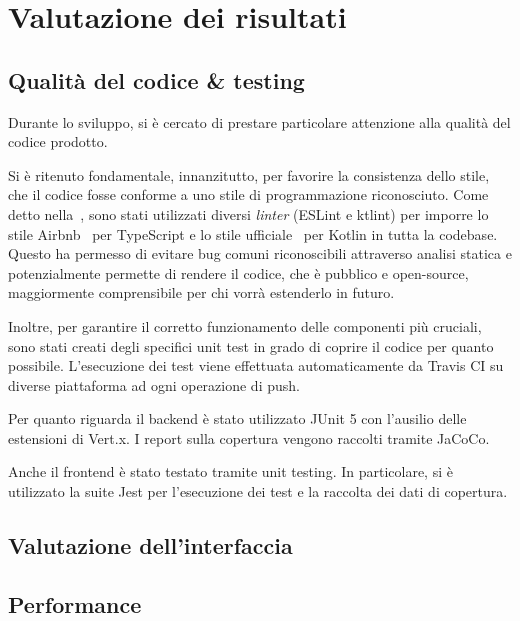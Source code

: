 \chapter{Valutazione dei risultati}\label{ch:evaluation}

  \section{Qualità del codice \& testing}
    Durante lo sviluppo, si è cercato di prestare particolare attenzione alla qualità del codice prodotto.

    Si è ritenuto fondamentale, innanzitutto, per favorire la consistenza dello stile, che il codice fosse conforme a uno stile di programmazione riconosciuto.
    Come detto nella~, sono stati utilizzati diversi \emph{linter} (ESLint e ktlint)
    per imporre lo stile Airbnb~\cite{airbnb-javascript} per TypeScript e lo stile ufficiale~\cite{pinterest-ktlint} per Kotlin in tutta la codebase.
    Questo ha permesso di evitare bug comuni riconoscibili attraverso analisi statica
    e potenzialmente permette di rendere il codice, che è pubblico e open-source, maggiormente comprensibile per chi vorrà estenderlo in futuro.

    Inoltre, per garantire il corretto funzionamento delle componenti più cruciali, sono stati creati degli specifici unit test in grado di coprire il codice per quanto possibile.
    L'esecuzione dei test viene effettuata automaticamente da Travis CI su diverse piattaforma ad ogni operazione di push.

    Per quanto riguarda il backend è stato utilizzato JUnit 5 con l'ausilio delle estensioni di Vert.x.
    I report sulla copertura vengono raccolti tramite JaCoCo.


    Anche il frontend è stato testato tramite unit testing.
    In particolare, si è utilizzato la suite Jest per l'esecuzione dei test e la raccolta dei dati di copertura.


  \section{Valutazione dell'interfaccia}


  \section{Performance}
